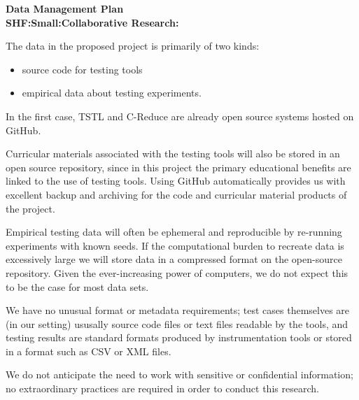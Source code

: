 \begin{center}
{\Large\sf\textbf{Data Management Plan\\
SHF:Small:Collaborative Research:\proptitle{}}}
\end{center}

The data in the proposed project is primarily of two kinds:
\begin{itemize}
\item
source code for testing tools
\item empirical data about testing experiments.
\end{itemize}

In the first case, TSTL and C-Reduce are already open source systems
hosted on GitHub.  

Curricular
materials associated with the testing tools will also be stored in
an open source repository, since in this project the primary
educational benefits are linked to the use of testing tools.  Using GitHub automatically provides us with excellent backup
and archiving for the code and curricular material products of the
project.

Empirical testing data will often be ephemeral and reproducible by
re-running experiments with known seeds.  If the computational burden
to recreate data is excessively large we will store data in a
compressed format on the open-source repository.
%
Given the ever-increasing power of computers, we do not expect
this to be the case for most data sets.


We have no unusual format or metadata requirements; test cases
themselves are (in our setting) ususally source code files or text
files readable by the tools, and testing results are standard
formats produced by instrumentation tools or stored in a format such
as CSV or XML files.

We do not anticipate the need to work with sensitive or confidential
information; no extraordinary practices are required in order to
conduct this research.
